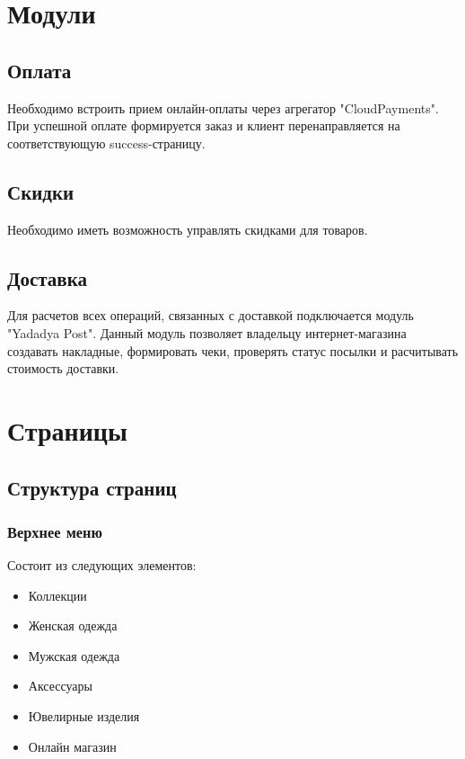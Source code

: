 \documentclass[DIV=calc, paper=a4, fontsize=11pt]{scrartcl} %
\begin{document}
\section{Модули}

\subsection{Оплата}
Необходимо встроить прием онлайн-оплаты через агрегатор "CloudPayments". При успешной оплате формируется заказ и клиент перенаправляется на соответствующую success-страницу.

\subsection{Скидки}
Необходимо иметь возможность управлять скидками для товаров.

\subsection{Доставка}\label{subsec:delivery}
Для расчетов всех операций, связанных с доставкой подключается модуль "Yadadya Post". Данный модуль позволяет владельцу интернет-магазина создавать накладные, формировать чеки, проверять статус посылки и расчитывать стоимость доставки.

\section{Страницы}

\subsection{Структура страниц}

\subsubsection{Верхнее меню}


Состоит из следующих элементов:
\begin{itemize}
	\item Коллекции
	\item Женская одежда
	\item Мужская одежда
	\item Аксессуары
	\item Ювелирные изделия 
	\item Онлайн магазин
\end{itemize}
\end{document}
